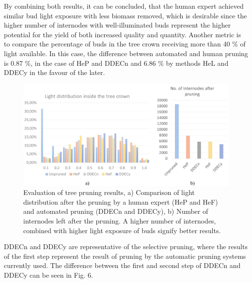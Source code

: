 \documentclass[1p]{elsarticle}
\begin{document}
By combining both results, it can be concluded, that the human expert
achieved similar bud light exposure with less biomass removed,
which is desirable since the higher number of internodes with
well-illuminated buds represent the higher potential for the yield of
both increased quality and quantity. Another metric is to compare the
percentage of buds in the tree crown receiving more than 40 \% of light
available. In this case, the difference between automated and human
pruning is 0.87 \%, in the case of HeP and DDECn and 6.86 \% by methods HeL and DDECy in the favour of the later.

\begin{figure}
    \centering
    \includegraphics[width=5in]{figs/image5.jpeg}
    \caption{Evaluation of tree pruning results, a) Comparison of
light distribution after the pruning by a human expert (HeP and HeF) and
automated pruning (DDECn and DDECy), b) Number of internodes left after
the pruning. A higher number of internodes, combined with higher light
exposure of buds signify better results.}
    \label{fig:my_label}
\end{figure}





DDECn and DDECy are representative of the selective pruning, where the
results of the first step represent the result of pruning by the
automatic pruning systems currently used. The difference between the
first and second step of DDECn and DDECy can be seen in Fig. 6.
\end{document}
